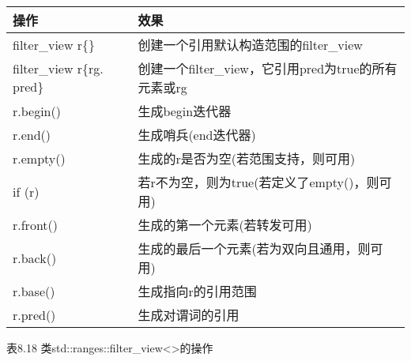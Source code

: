 \begin{longtable}[c]{|l|l|}
\hline
\textbf{操作} & \textbf{效果}                                                \\ \hline
\endfirsthead
%
\endhead
%
filter\_view r\{\}         & 创建一个引用默认构造范围的filter\_view               \\ \hline
filter\_view r\{rg. pred\} & 创建一个filter\_view，它引用pred为true的所有元素或rg \\ \hline
r.begin()          & 生成begin迭代器                                      \\ \hline
r.end()            & 生成哨兵(end迭代器)                              \\ \hline
r.empty()          & 生成的r是否为空(若范围支持，则可用)  \\ \hline
if (r)             & 若r不为空，则为true(若定义了empty()，则可用)       \\ \hline
r.front()          & 生成的第一个元素(若转发可用)              \\ \hline
r.back()           & 生成的最后一个元素(若为双向且通用，则可用) \\ \hline
r.base()           & 生成指向r的引用范围       \\ \hline
r.pred()           & 生成对谓词的引用                            \\ \hline
\end{longtable}

\begin{center}
表8.18 类std::ranges::filter\_view<>的操作
\end{center}
